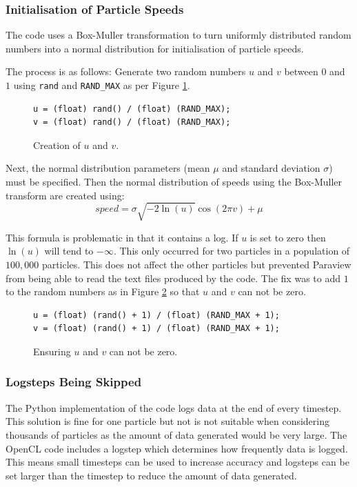\documentclass[../Interim_Report_Master]{subfiles}
\begin{document}
\subsubsection{Initialisation of Particle Speeds}
The code uses a Box-Muller transformation to turn uniformly distributed random numbers into a normal distribution for initialisation of particle speeds. 

The process is as follows:
Generate two random numbers $u$ and $v$ between $0$ and $1$ using \lstinline[style=cstyleintext]|rand| and \lstinline[style=cstyleintext]|RAND_MAX| as per Figure \ref{code:uv_gen}.
\begin{figure}[h]
\begin{lstlisting}[frame=single, style=cstyle]
u = (float) rand() / (float) (RAND_MAX);
v = (float) rand() / (float) (RAND_MAX);
\end{lstlisting}
\caption{Creation of $u$ and $v$.}
\label{code:uv_gen}
\end{figure}

Next, the normal distribution parameters (mean $\mu$ and standard deviation $\sigma$) must be specified. Then the normal distribution of speeds using the Box-Muller transform are created using:
\begin{equation}
speed = \sigma \sqrt{-2\ln(u)} \cos(2\pi v) + \mu
\end{equation}

This formula is problematic in that it contains a log. If $u$ is set to zero then $\ln(u)$ will tend to $-\infty$. This only occurred for two particles in a population of $100,000$ particles. This does not affect the other particles but prevented Paraview from being able to read the text files produced by the code. The fix was to add $1$ to the random numbers as in Figure \ref{code:uv_fix} so that $u$ and $v$ can not be zero.
\begin{figure}[h]
\begin{lstlisting}[frame=single, style=cstyle]
u = (float) (rand() + 1) / (float) (RAND_MAX + 1);
v = (float) (rand() + 1) / (float) (RAND_MAX + 1);
\end{lstlisting}
\caption{Ensuring $u$ and $v$ can not be zero.}
\label{code:uv_fix}
\end{figure}

\subsubsection{Logsteps Being Skipped}
The Python implementation of the code logs data at the end of every timestep. This solution is fine for one particle but not is not suitable when considering thousands of particles as the amount of data generated would be very large. The OpenCL code includes a logstep which determines how frequently data is logged. This means small timesteps can be used to increase accuracy and logsteps can be set larger than the timestep to reduce the amount of data generated.
\end{document}
